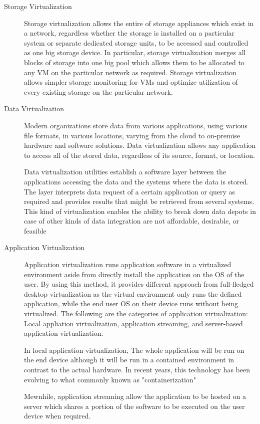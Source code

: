 \documentclass[../index.tex]{subfiles}
\begin{document}
\begin{description}
	\item[Storage Virtualization] Storage virtualization allows the entire of storage appliances which
		exist in a network, regardless whether the storage is installed on a particular system or
		separate dedicated storage units, to be accessed and controlled as one big storage device. In
		particular, storage virtualization merges all blocks of storage into one big pool which allows
		them to be allocated to any VM on the particular network as required. Storage virtualization
		allows simpler storage monitoring for VMs and optimize utilization of every existing storage on
		the particular network.

	\item[Data Virtualization] Modern organizations store data from various applications, using
		various file formats, in various locations, varying from the cloud to on-premise hardware and
		software solutions. Data virtualization allows any application to access all of the stored data,
		regardless of its source, format, or location.

		Data virtualization utilities establish a software layer between the applications accessing the
		data and the systems where the data is stored. The layer interprets data request of a certain
		application or query as required and provides results that might be retrieved from several
		systems. This kind of virtualization enables the ability to break down data depots in case of
		other kinds of data integration are not affordable, desirable, or feasible

	\item[Application Virtualization] Application virtualization runs application software in a
		virtualized environment aside from directly install the application on the OS of the user. By
		using this method, it provides different approach from full-fledged desktop virtualization as
		the virtual environment only runs the defined application, while the end user OS on their device
		runs without being virtualized. The following are the categories of application virtualization:
		Local appliation virtualization, application streaming, and server-based application
		virtualization.

		In local application virtualization, The whole application will be run on the end device
		although it will be run in a contained environment in contrast to the actual hardware. In recent
		years, this technology has been evolving to what commonly known as "containerization"

		Mewnhile, application streaming allow the application to be hosted on a server which shares a
		portion of the software to be executed on the user device when required.


\end{description}
\end{document}
